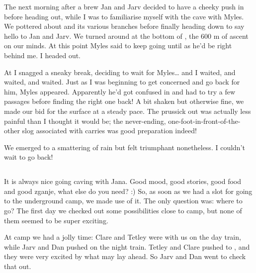 The next morning after a brew Jan and Jarv decided to have a cheeky push
in  before heading out, while I was to familiarise
myself with the cave with Myles. We pottered about 
and its various branches before finally heading down 
to say hello to Jan and Jarv. We turned around at the bottom of , the 600 m of ascent on our minds. At this point Myles said
to keep going until  as he'd be right behind me.
I headed out.

At  I snagged a sneaky break, deciding to wait for
Myles\ldots{} and I waited, and waited, and waited. Just as I was
beginning to get concerned and go back for him, Myles appeared.
Apparently he'd got confused in  and had to try a few
passages before finding the right one back! A bit shaken but otherwise
fine, we made our bid for the surface at a steady pace. The prussick out
was actually less painful than I thought it would be; the never-ending,
one-foot-in-front-of-the-other slog associated with carries was good
preparation indeed!

We emerged to a smattering of rain but felt triumphant nonetheless. I
couldn't wait to go back!



\subsection{\texorpdfstring{}{Stuck in Paradise}}

It is always nice going caving with Jana. Good mood, good stories, good
food and good zganje, what else do you need? :) So, as soon as we had a
slot for going to the underground camp, we made use of it. The only
question was: where to go? The first day we checked out some
possibilities close to camp, but none of them seemed to be super
exciting.

At camp we had a jolly time: Clare and Tetley were with us on the day
train, while Jarv and Dan pushed on the night train. Tetley and Clare
pushed  to , and they were very
excited by what may lay ahead. So Jarv and Dan went to check that out.

